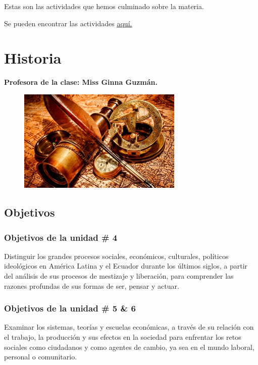 \documentclass[a4paper, 12pt]{article}
\begin{document}
Estas son las actividades que hemos culminado sobre la materia.

Se pueden encontrar las actividades \href{https://drive.google.com/drive/folders/1h1XjvVwmMZPTBrb_DGk4VFDaQa4U9lXx?usp=sharing}{\underline{aquí.}}

\section{Historia}

\textbf{Profesora de la clase: Miss Ginna Guzmán.}

\begin{figure}[h]
  \includegraphics[width=0.7\textwidth, center]{historia.jpeg}
\end{figure}

\subsection{Objetivos}

\subsubsection{Objetivos de la unidad \# 4}

Distinguir los grandes procesos sociales, económicos, culturales, políticos
ideológicos en América Latina y el Ecuador durante los últimos siglos, a partir del análisis de sus procesos de mestizaje y liberación, para comprender las razones profundas de sus formas de ser, pensar y actuar.

\subsubsection{Objetivos de la unidad \# 5 \& 6}

Examinar los sistemas, teorías y escuelas económicas, a través de su relación con el trabajo, la producción y sus efectos en la sociedad para enfrentar los retos sociales como ciudadanos y como agentes de cambio, ya sea en el mundo laboral, personal o comunitario.
\end{document}
